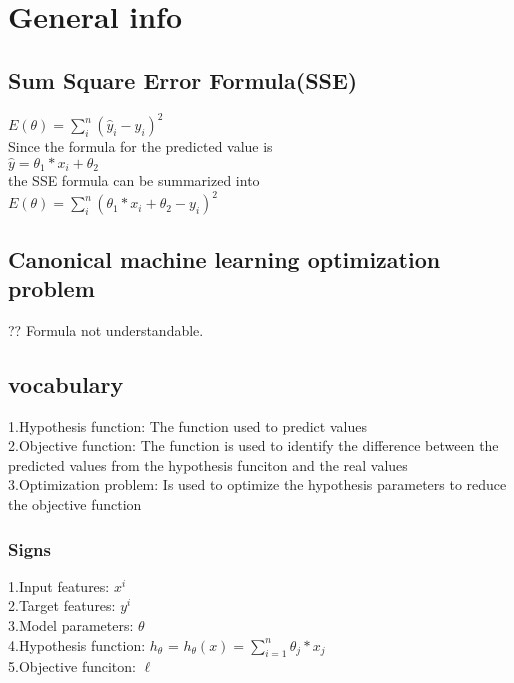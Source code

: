 \documentclass{article}
\begin{document}
\section{General info}
\subsection{Sum Square Error Formula(SSE)}
$E(\theta)= \sum_{i}^{n} (\hat{y}_i - y_i)^2$ \\
Since the formula for the predicted value is \\
$\hat{y} = \theta_1 * x_i + \theta_2$ \\ 
the SSE formula can be summarized into\\
$ E(\theta) = \sum_{i}^{n} (\theta_1 * x_i + \theta_2 - y_i) ^2$

\subsection{Canonical machine learning optimization problem}
?? Formula not understandable.

\subsection{vocabulary}
1.Hypothesis function: The function used to predict values \\
2.Objective function: The function is used to identify the difference between the predicted values from the hypothesis funciton and the real values \\
3.Optimization problem: Is used to optimize the hypothesis parameters to reduce the objective function
\subsubsection{Signs}
1.Input features: $x^i$ \\
2.Target features: $y^i$ \\
3.Model parameters: $\theta$ \\ 
4.Hypothesis function: $h_\theta$ = $h_\theta(x) = \sum_{i=1}^{n} \theta_j * x_j$ \\
5.Objective funciton: $\ell$
\end{document}

